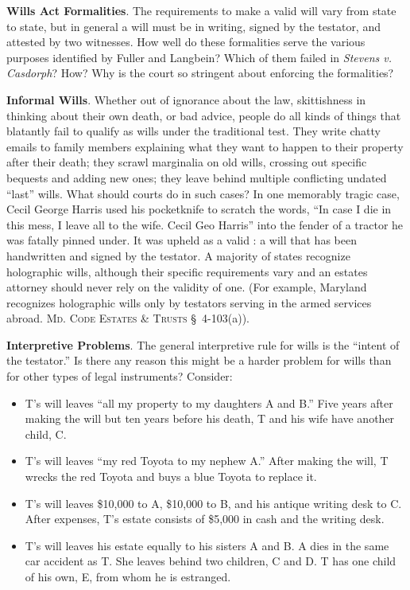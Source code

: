 
\item \textbf{Wills Act Formalities}. The requirements to make a valid will vary
from state to state, but in general a will must be in writing, signed by the
testator, and attested by two witnesses. How well do these formalities serve
the various purposes identified by Fuller and Langbein? Which of them failed in
\textit{Stevens v. Casdorph}? How? Why is the court so stringent about
enforcing the formalities?


\item \textbf{Informal Wills}. Whether out of ignorance about the law,
skittishness in thinking about their own death, or bad advice, people do all
kinds of things that blatantly fail to qualify as wills under the traditional
test. They write chatty emails to family members explaining what they want to
happen to their property after their death; they scrawl marginalia on old
wills, crossing out specific bequests and adding new ones; they leave behind
multiple conflicting undated ``last'' wills. What should courts do in such
cases? In one memorably tragic case, Cecil George Harris used his pocketknife
to scratch the words, ``In case I die in this mess, I leave all to the wife.
Cecil Geo Harris'' into the fender of a tractor he was fatally
pinned under. It was upheld as a valid : a
will that has been handwritten and signed by the testator. A majority of states
recognize holographic wills, although their specific requirements vary and an
estates attorney should never rely on the validity of one. (For example,
Maryland recognizes holographic wills only by testators serving in the armed
services abroad. \textsc{Md. Code Estates \& Trusts} \S~4-103(a)).


\item \textbf{Interpretive Problems}. The general interpretive rule for wills is
the ``intent of the testator.'' Is there any reason this might be a harder
problem for wills than for other types of legal instruments? Consider:
\begin{itemize}
\item T's will leaves ``all my property to my daughters A and B.'' Five years
after making the will but ten years before his death, T and his wife have
another child, C.
\item T's will leaves ``my red Toyota to my nephew A.'' After making the will, T
wrecks the red Toyota and buys a blue Toyota to replace it.
\item T's will leaves \$10,000 to A, \$10,000 to B, and his antique writing desk
to C. After expenses, T's estate consists of \$5,000 in cash and the writing
desk.
\item T's will leaves his estate equally to his sisters A and B. A dies in the
same car accident as T. She leaves behind two children, C and D. T has one
child of his own, E, from whom he is estranged.
\end{itemize}

